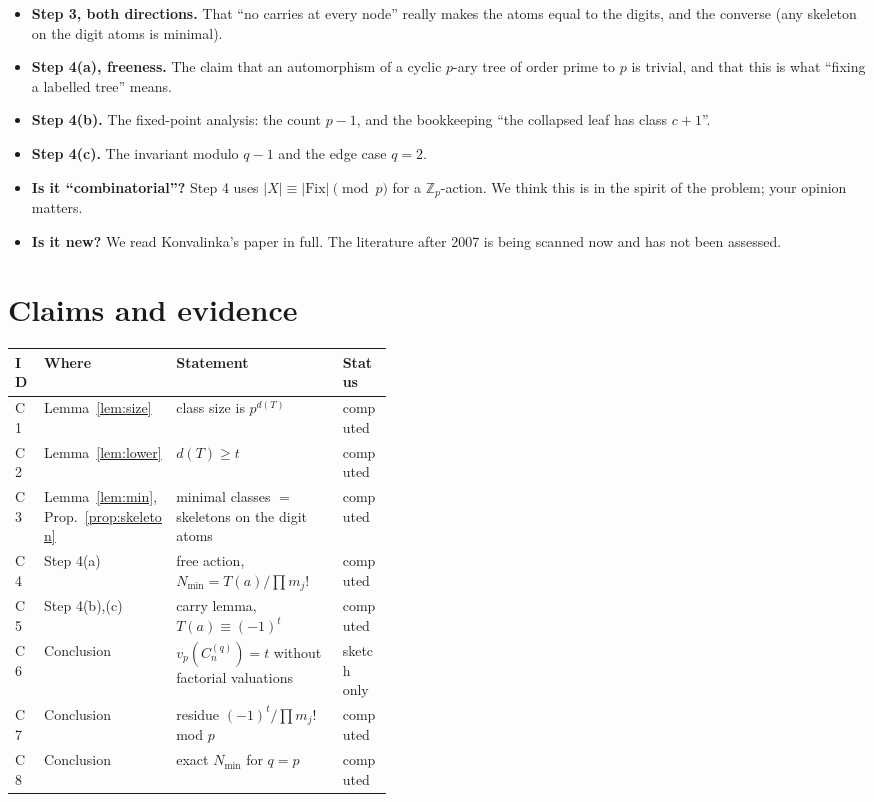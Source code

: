 \documentclass[11pt]{article}
\theoremstyle{definition}
\newcommand{\vp}{v_p}
\newcommand{\C}[1]{C^{(q)}_{#1}}
\newcommand{\Z}{\mathbb{Z}}
\begin{document}
\begin{itemize}
\item \textbf{Step 3, both directions.} That ``no carries at every node'' really makes the
      atoms equal to the digits, and the converse (any skeleton on the digit atoms is minimal).
\item \textbf{Step 4(a), freeness.} The claim that an automorphism of a cyclic $p$-ary tree
      of order prime to $p$ is trivial, and that this is what ``fixing a labelled tree'' means.
\item \textbf{Step 4(b).} The fixed-point analysis: the count $p-1$, and the bookkeeping
      ``the collapsed leaf has class $c+1$''.
\item \textbf{Step 4(c).} The invariant modulo $q-1$ and the edge case $q=2$.
\item \textbf{Is it ``combinatorial''?} Step 4 uses $|X|\equiv|\mathrm{Fix}|\pmod p$ for a
      $\Z_p$-action. We think this is in the spirit of the problem; your opinion matters.
\item \textbf{Is it new?} We read Konvalinka's paper in full. The literature after 2007 is
      being scanned now and has not been assessed.
\end{itemize}

\section{Claims and evidence}\label{sec:claims}

\begin{center}
\renewcommand{\arraystretch}{1.25}
\begin{tabular}{@{}llp{0.44\linewidth}l@{}}
\hline
ID & Where & Statement & Status \\
\hline
C1 & Lemma~\ref{lem:size} & class size is $p^{d(T)}$ & computed \\
C2 & Lemma~\ref{lem:lower} & $d(T)\ge t$ & computed \\
C3 & Lemma~\ref{lem:min}, Prop.~\ref{prop:skeleton} & minimal classes $=$ skeletons on the digit atoms & computed \\
C4 & Step 4(a) & free action, $N_{\min}=T(a)/\prod m_j!$ & computed \\
C5 & Step 4(b),(c) & carry lemma, $T(a)\equiv(-1)^t$ & computed \\
C6 & Conclusion & $\vp(\C{n})=t$ without factorial valuations & sketch only \\
C7 & Conclusion & residue $(-1)^t/\prod m_j!$ mod $p$ & computed \\
C8 & Conclusion & exact $N_{\min}$ for $q=p$ & computed \\
\hline
\end{tabular}
\end{center}
\end{document}
